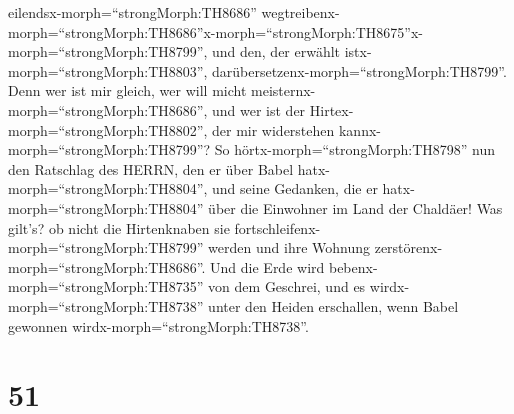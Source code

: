 eilendsx-morph=``strongMorph:TH8686''
wegtreibenx-morph=``strongMorph:TH8686''\textbar x-morph=``strongMorph:TH8675''x-morph=``strongMorph:TH8799'',
und den, der erwählt istx-morph=``strongMorph:TH8803'',
darübersetzenx-morph=``strongMorph:TH8799''. Denn wer ist mir gleich,
wer will micht meisternx-morph=``strongMorph:TH8686'', und wer ist der
Hirtex-morph=``strongMorph:TH8802'', der mir widerstehen
kannx-morph=``strongMorph:TH8799''?  So
hörtx-morph=``strongMorph:TH8798'' nun den Ratschlag des HERRN, den er
über Babel hatx-morph=``strongMorph:TH8804'', und seine Gedanken, die er
hatx-morph=``strongMorph:TH8804'' über die Einwohner im Land der
Chaldäer! Was gilt's? ob nicht die Hirtenknaben sie
fortschleifenx-morph=``strongMorph:TH8799'' werden und ihre Wohnung
zerstörenx-morph=``strongMorph:TH8686''.  Und die Erde wird
bebenx-morph=``strongMorph:TH8735'' von dem Geschrei, und es
wirdx-morph=``strongMorph:TH8738'' unter den Heiden erschallen, wenn
Babel gewonnen wirdx-morph=``strongMorph:TH8738''.

\hypertarget{section-50}{%
\section{51}\label{section-50}}

